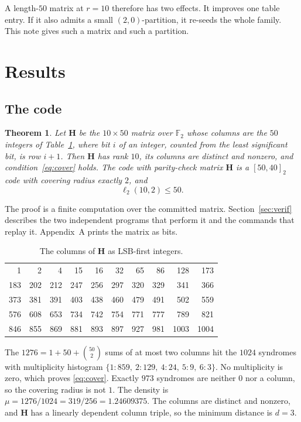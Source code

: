 \documentclass[11pt,a4paper]{article}
\newcommand{\FF}{\mathbb{F}}
\newcommand{\HH}{\boldsymbol{H}}
\newcommand{\ellr}{\ell_2}
\newtheorem{theorem}{Theorem}
\theoremstyle{remark}
\begin{document}
A length-$50$ matrix at $r=10$ therefore has two effects. It improves
one table entry. If it also admits a small $(2,0)$-partition, it
re-seeds the whole family. This note gives such a matrix and such a
partition.

\section{Results}

\subsection{The code}

\begin{theorem}
\label{thm:main}
Let $\HH$ be the $10\times 50$ matrix over $\FF_2$ whose columns are
the $50$ integers of Table~\ref{tab:cols}, where bit $i$ of an integer,
counted from the least significant bit, is row $i+1$. Then $\HH$ has
rank $10$, its columns are distinct and nonzero, and
condition~\eqref{eq:cover} holds. The code with parity-check matrix
$\HH$ is a $[50,40]_2$ code with covering radius exactly $2$, and
\[
\ellr(10,2)\le 50 .
\]
\end{theorem}

The proof is a finite computation over the committed matrix.
Section~\ref{sec:verif} describes the two independent programs that
perform it and the commands that replay it. Appendix~A prints the
matrix as bits.

\begin{table}[ht]
\centering
\small
\begin{tabular}{@{}*{10}{r}@{}}
  1 & 2 & 4 & 15 & 16 & 32 & 65 & 86 & 128 & 173 \\
183 & 202 & 212 & 247 & 256 & 297 & 320 & 329 & 341 & 366 \\
373 & 381 & 391 & 403 & 438 & 460 & 479 & 491 & 502 & 559 \\
576 & 608 & 653 & 734 & 742 & 754 & 771 & 777 & 789 & 821 \\
846 & 855 & 869 & 881 & 893 & 897 & 927 & 981 & 1003 & 1004 \\
\end{tabular}
\caption{The columns of $\HH$ as LSB-first integers.}
\label{tab:cols}
\end{table}

The $1276=1+50+\binom{50}{2}$ sums of at most two columns hit the
$1024$ syndromes with multiplicity histogram
$\{1{:}859,\ 2{:}129,\ 4{:}24,\ 5{:}9,\ 6{:}3\}$. No multiplicity is
zero, which proves \eqref{eq:cover}. Exactly $973$ syndromes are
neither $0$ nor a column, so the covering radius is not $1$. The
density is $\mu=1276/1024=319/256=1.24609375$. The columns are distinct
and nonzero, and $\HH$ has a linearly dependent column triple, so the
minimum distance is $d=3$.
\end{document}
